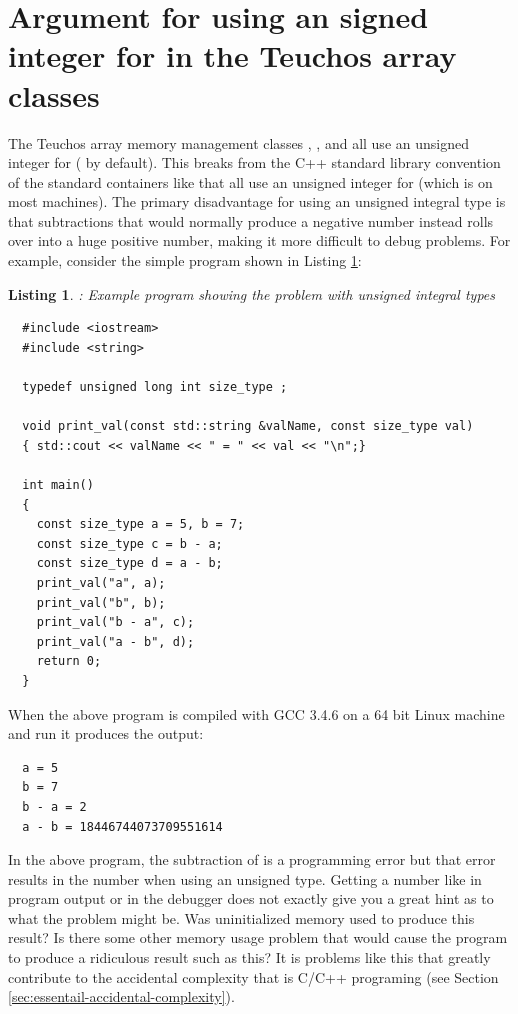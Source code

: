 \documentclass[pdf,ps2pdf,11pt]{SANDreport}
\newtheorem{listing}{Listing}
\begin{document}
%
{}\section{Argument for using an signed integer for
{} in the Teuchos array classes}
\label{sec:unsigned_size_type}
%

The Teuchos array memory management classes {},
{}, and {} all use an unsigned integer
for {} ({} by default).  This breaks
from the C++ standard library convention of the standard containers
like {} that all use an unsigned integer for
{} (which is {} on most
machines).  The primary disadvantage for using an unsigned integral
type is that subtractions that would normally produce a negative number
instead rolls over into a huge positive number, making it more
difficult to debug problems.  For example, consider the simple program
shown in Listing {}\ref{listing:unsigned-int-problem}:


{}\begin{listing}: Example program showing the problem with unsigned
integral types
\label{listing:unsigned-int-problem}
{\small\begin{verbatim}
  #include <iostream>
  #include <string>
  
  typedef unsigned long int size_type ;
  
  void print_val(const std::string &valName, const size_type val)
  { std::cout << valName << " = " << val << "\n";}
  
  int main()
  {
    const size_type a = 5, b = 7;
    const size_type c = b - a;
    const size_type d = a - b;
    print_val("a", a);
    print_val("b", b);
    print_val("b - a", c);
    print_val("a - b", d);
    return 0;
  }
\end{verbatim}}
\end{listing}


When the above program is compiled with GCC 3.4.6 on a 64 bit Linux
machine and run it produces the output:


{\small\begin{verbatim}
  a = 5
  b = 7
  b - a = 2
  a - b = 18446744073709551614
\end{verbatim}}


In the above program, the subtraction of {} is a programming
error but that error results in the number
{} when using an unsigned type.  Getting a
number like {} in program output or in the
debugger does not exactly give you a great hint as to what the problem
might be.  Was uninitialized memory used to produce this result?  Is
there some other memory usage problem that would cause the program to
produce a ridiculous result such as this?  It is problems like this
that greatly contribute to the accidental complexity that is C/C++
programing (see Section {}\ref{sec:essentail-accidental-complexity}).
\end{document}
